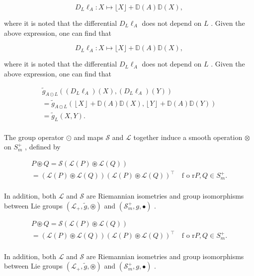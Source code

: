 \documentclass[11pt]{article}
\begin{document}
$$
D _ {L} \ell_ {A}: X \mapsto \lfloor X \rfloor + \mathbb {D} (A) \mathbb {D} (X), \tag {3.2}
$$

where it is noted that the differential  $D_{L}\ell_{A}$  does not depend on  $L$ . Given the above expression, one can find that

$$
D _ {L} \ell_ {A}: X \mapsto \lfloor X \rfloor + \mathbb {D} (A) \mathbb {D} (X), \tag {3.2}
$$

where it is noted that the differential  $D_{L}\ell_{A}$  does not depend on  $L$ . Given the above expression, one can find that

$$
\begin{array}{l} \tilde {g} _ {A \odot L} ((D _ {L} \ell_ {A}) (X), (D _ {L} \ell_ {A}) (Y)) \\ = \tilde {g} _ {A \odot L} (\left\lfloor X \right\rfloor + \mathbb {D} (A) \mathbb {D} (X), \left\lfloor Y \right\rfloor + \mathbb {D} (A) \mathbb {D} (Y)) \\ = \tilde {g} _ {L} (X, Y). \\ \end{array}
$$

The group operator  $\odot$  and maps  $\mathcal{S}$  and  $\mathcal{L}$  together induce a smooth operation  $\otimes$  on  $S_{m}^{+}$ , defined by

$$
\begin{array}{l} P \circledast Q = \mathcal {S} (\mathcal {L} (P) \circledast \mathcal {L} (Q)) \\ = \left(\mathcal {L} (P) \circledast \mathcal {L} (Q)\right) \left(\mathcal {L} (P) \circledast \mathcal {L} (Q)\right) ^ {\top} \quad \text {f o r} P, Q \in S _ {m} ^ {+}. \\ \end{array}
$$

In addition, both  $\mathcal{L}$  and  $\mathcal{S}$  are Riemannian isometries and group isomorphisms between Lie groups  $(\mathcal{L}_{+},\tilde{g},\circledast)$  and  $(\mathcal{S}_m^+,g,\bullet)$ .

$$
\begin{array}{l} P \circledast Q = \mathcal {S} (\mathcal {L} (P) \circledast \mathcal {L} (Q)) \\ = \left(\mathcal {L} (P) \circledast \mathcal {L} (Q)\right) \left(\mathcal {L} (P) \circledast \mathcal {L} (Q)\right) ^ {\top} \quad \text {f o r} P, Q \in S _ {m} ^ {+}. \\ \end{array}
$$

In addition, both  $\mathcal{L}$  and  $\mathcal{S}$  are Riemannian isometries and group isomorphisms between Lie groups  $(\mathcal{L}_{+},\tilde{g},\circledast)$  and  $(\mathcal{S}_m^+,g,\bullet)$ .
\end{document}
